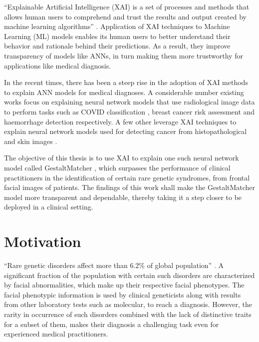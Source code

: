 \documentclass[../report.tex]{subfiles}
\begin{document}
	\enquote{Explainable Artificial Intelligence (XAI) is a set of processes and methods that allows human users to comprehend and trust the results and output created by machine learning algorithms} \cite{BibEntry2021Mar}. Application of XAI techniques to Machine Learning (ML) models enables its human users to better understand their behavior and rationale behind their predictions. As a result, they improve transparency of models like ANNs, in turn making them more trustworthy for applications like medical diagnosis.
	
	In the recent times, there has been a steep rise in the adoption of XAI methods to explain ANN models for medical diagnoses. A considerable number existing works focus on explaining neural network models that use radiological image data to perform tasks such as COVID classification \cite{ghoshal2020estimating}, breast cancer risk assessment \cite{qian2021prospective} and haemorrhage detection \cite{lee2019explainable} respectively. A few other leverage XAI techniques to explain neural network models used for detecting cancer from histopathological \cite{binder2021morphological} and skin images \cite{nunnari2021overlap}. 
	
	The objective of this thesis is to use XAI to explain one such neural network model called GestaltMatcher \cite{hsieh2022gestaltmatcher}, which surpasses the performance of clinical practitioners in the identification of certain rare genetic syndromes, from frontal facial images of patients. The findings of this work shall make the GestaltMatcher model more transparent and dependable, thereby taking it a step closer to be deployed in a clinical setting.
	
	

    \section{Motivation}
    \enquote{Rare genetic disorders affect more than 6.2\% of global population} \cite{hsieh2022gestaltmatcher}. A significant fraction of the population with certain such disorders are characterized by facial abnormalities, which make up their respective facial phenotypes. The facial phenotypic information is used by clinical geneticists along with results from other laboratory tests such as molecular, to reach a diagnosis. However, the rarity in occurrence of such disorders combined with the lack of distinctive traits for a subset of them, makes their diagnosis a challenging task even for experienced medical practitioners.  
    
\end{document}
